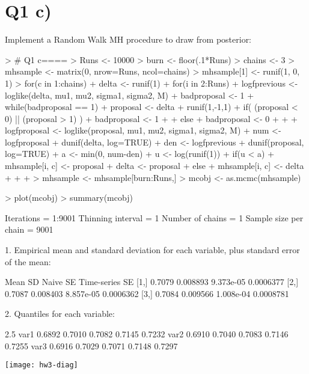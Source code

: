 \documentclass{article}
\begin{document}
\section*{Q1 c)}
Implement a Random Walk MH procedure to draw from posterior:
\begin{Schunk}
\begin{Sinput}
> # Q1 c====
> Runs <- 10000
> burn <- floor(.1*Runs)
> chains <- 3
> mhsample <- matrix(0, nrow=Runs, ncol=chains)
> mhsample[1] <- runif(1, 0, 1)
> for(c in 1:chains){
+   delta <- runif(1)
+   for(i in 2:Runs){
+     logfprevious <- loglike(delta, mu1, mu2, sigma1, sigma2, M)
+     badproposal <- 1
+     while(badproposal == 1){
+       proposal <- delta + runif(1,-1,1)
+       if( (proposal < 0) || (proposal > 1) ){
+         badproposal <- 1
+       }
+       else{
+         badproposal <- 0
+       }
+     }
+     logfproposal <- loglike(proposal, mu1, mu2, sigma1, sigma2, M)
+     num <-  logfproposal + dunif(delta, log=TRUE)
+     den <- logfprevious + dunif(proposal, log=TRUE)
+     a <- min(0, num-den)
+     u <- log(runif(1))
+     if(u < a){
+       mhsample[i, c] <- proposal  
+       delta <- proposal
+     }else{
+       mhsample[i, c] <- delta
+     }
+   }
+ }
> mhsample <- mhsample[burn:Runs,]
> mcobj <- as.mcmc(mhsample)
\end{Sinput}
\end{Schunk}
\begin{Schunk}
\begin{Sinput}
> plot(mcobj)
> summary(mcobj)
\end{Sinput}
\begin{Soutput}
Iterations = 1:9001
Thinning interval = 1 
Number of chains = 1 
Sample size per chain = 9001 

1. Empirical mean and standard deviation for each variable,
   plus standard error of the mean:

       Mean       SD  Naive SE Time-series SE
[1,] 0.7079 0.008893 9.373e-05      0.0006377
[2,] 0.7087 0.008403 8.857e-05      0.0006362
[3,] 0.7084 0.009566 1.008e-04      0.0008781

2. Quantiles for each variable:

       2.5%    25%    50%    75%  97.5%
var1 0.6892 0.7010 0.7082 0.7145 0.7232
var2 0.6910 0.7040 0.7083 0.7146 0.7255
var3 0.6916 0.7029 0.7071 0.7148 0.7297
\end{Soutput}
\end{Schunk}
\texttt{[image: hw3-diag]}
\end{document}
